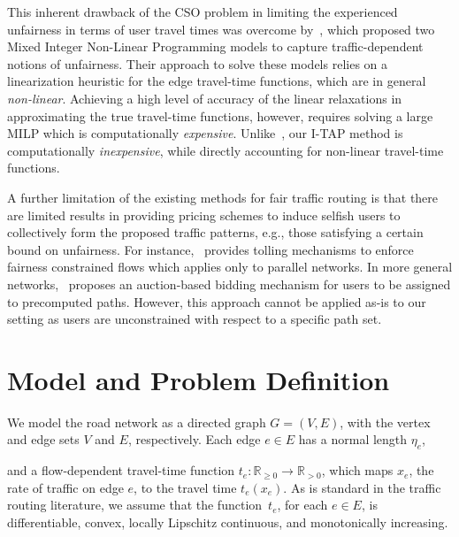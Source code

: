 \documentclass{article}
\newif\ifarxiv   %
\begin{document}
This inherent drawback of the CSO problem in limiting the experienced unfairness in terms of user travel times was overcome by~\cite{ANGELELLI2020105016}, which proposed two Mixed Integer Non-Linear Programming models to capture traffic-dependent notions of unfairness. Their approach to solve these models relies on a linearization heuristic for the edge travel-time functions, which are in general \emph{non-linear}. Achieving a high level of accuracy of the linear relaxations in approximating the true travel-time functions, however, requires solving a large MILP which is computationally \emph{expensive}. Unlike~\cite{ANGELELLI2020105016}, our I-TAP method is computationally \emph{inexpensive}, while directly accounting for non-linear travel-time functions.


A further limitation of the existing methods for fair traffic routing is that there are limited results in providing pricing schemes to induce selfish users to collectively form the proposed traffic patterns, e.g., those satisfying a certain bound on unfairness. For instance,~\cite{marden-parallel} provides tolling mechanisms to enforce fairness constrained flows which applies only \ifarxiv to the simplified model of a parallel network\else to parallel networks\fi. In more general networks,~\cite{lujak-ue-so} proposes an auction-based bidding mechanism for users to be assigned to precomputed paths. However, this approach cannot be applied as-is to our setting as users are unconstrained with respect to a specific path set. \ifarxiv Thus, we develop road tolling mechanisms to induce selfish users to collectively form traffic assignments guaranteeing a specified level of unfairness. \fi


\section{Model and Problem Definition} \label{sec:model}
We model the road network as a directed graph $G = (V, E)$, with the vertex and edge sets $V$ and $E$, respectively. Each edge $e \in E$ has a normal length $\eta_e$, 
\ifarxiv 
which represents a fixed quantity such as the physical length of the corresponding road segment, \fi 
and a flow-dependent travel-time function $t_e: \mathbb{R}_{\geq 0} \rightarrow \mathbb{R}_{> 0}$, which maps $x_e$, the rate of traffic on edge $e$, to the travel time $t_e(x_e)$. 
As is standard in the traffic routing literature, we
assume that the function~$t_e$, for each $e \in E$, is differentiable, convex, locally Lipschitz continuous, and monotonically increasing.
\end{document}
